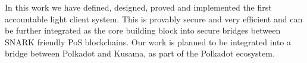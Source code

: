 In this work we have defined, designed, proved and implemented the first accountable light client system. This is provably secure and 
very efficient and can be further integrated as the core building block into secure bridges between SNARK friendly PoS blockchains. Our work is planned to be integrated into a bridge between Polkadot and Kusama, as part of the Polkadot ecosystem.
\vspace{-0.1in}
